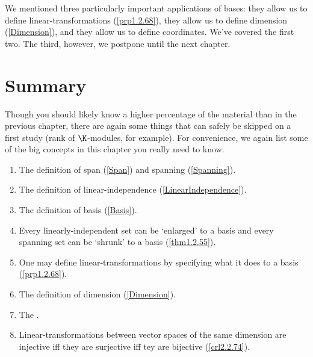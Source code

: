 We mentioned three particularly important applications of bases:  they allow us to define linear-transformations (\cref{prp1.2.68}), they allow us to define dimension (\cref{Dimension}), and they allow us to define coordinates.  We've covered the first two.  The third, however, we postpone until the next chapter.

\section{Summary}

Though you should likely know a higher percentage of the material than in the previous chapter, there are again some things that can safely be skipped on a first study (rank of $\K$-modules, for example).  For convenience, we again list some of the big concepts in this chapter you really need to know.
\begin{enumerate}
	\item The definition of span (\cref{Span}) and spanning (\cref{Spanning}).
	\item The definition of linear-independence (\cref{LinearIndependence}).
	\item The definition of basis (\cref{Basis}).
	\item Every linearly-independent set can be `enlarged' to a basis and every spanning set can be `shrunk' to a basis (\cref{thm1.2.55}).
	\item One may define linear-transformations by specifying what it does to a basis (\cref{prp1.2.68}).
	\item The definition of dimension (\cref{Dimension}).
	\item The .
	\item Linear-transformations between vector spaces of the same dimension are injective iff they are surjective iff tey are bijective (\cref{crl2.2.74}).
\end{enumerate}